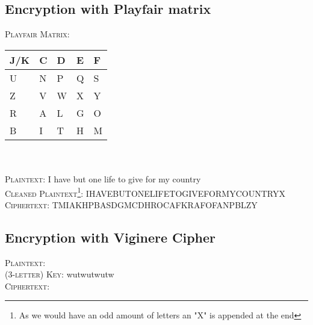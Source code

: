 \documentclass{report}
\begin{document}
		\subsection{Encryption with Playfair matrix}
		\startsubsection
			\textsc{Playfair Matrix}:
			\begin{tabular}{|M{0.3cm}|M{0.3cm}|M{0.3cm}|M{0.3cm}|M{0.3cm}|}
				\hline
				\hspace*{-0.4em} J/K & C & D & E & F \\
				\hline
				U & N & P & Q & S \\
				\hline
				Z & V & W & X & Y \\
				\hline
				R & A & L & G & O \\
				\hline
				B & I & T & H & M \\
				\hline
			\end{tabular}
			\hfill \\ \\
			\textsc{Plaintext}:  I have but one life to give for my country \\
			\textsc{Cleaned Plaintext\footnote{As we would have an odd amount of letters an "X" is appended at the end}}: IHAVEBUTONELIFETOGIVEFORMYCOUNTRYX \\
			\textsc{Ciphertext}: TMIAKHPBASDGMCDHROCAFKRAFOFANPBLZY
		\closesection
		\subsection{Encryption with Viginere Cipher}
		\startsubsection
			\textsc{Plaintext}:  \\
			\textsc{(3-letter) Key}: wutwutwutw \\
			\textsc{Ciphertext}: 
		\closesection
	\closesection
\end{document}
